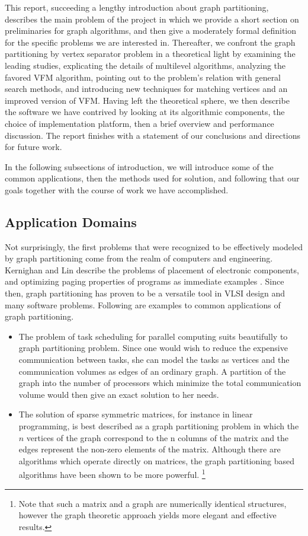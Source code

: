 \documentclass[a4paper,12pt]{article}
\begin{document}
This report, succeeding a lengthy introduction about graph
partitioning, describes the main problem of the project in which we
provide a short section on preliminaries for graph algorithms, and
then give a moderately formal definition for the specific problems we
are interested in. Thereafter, we confront the graph partitioning  by
vertex separator problem in a  theoretical light by examining the
leading studies, explicating the details of multilevel algorithms,
analyzing the favored VFM algorithm, pointing out to the problem's
 relation with
general search methods, and introducing new techniques for matching
vertices and an improved version of VFM. Having left the theoretical
sphere, we then describe the software we have contrived by looking at
its algorithmic components, the choice of implementation platform,
then a brief overview and performance discussion. The report finishes
with a statement of our conclusions and directions for future work.

In the following subsections of introduction, we will
introduce some of the common applications, then the methods used for solution,
and following that our goals together with the course of work we have
accomplished.

\subsection{Application Domains}

Not surprisingly, the first problems that were recognized to be
effectively modeled by graph partitioning come from the realm of
computers and engineering. Kernighan and Lin describe the problems of
placement of electronic components, and optimizing paging properties
of programs as immediate examples \cite{kl}. Since then, graph
partitioning has proven to be a versatile tool in VLSI design and
many software problems. Following are examples to
common applications of graph partitioning.
\begin{itemize}
\item The problem of task scheduling for parallel computing
suits beautifully to graph partitioning problem. Since one would wish to
reduce the expensive communication between tasks, she can model the
tasks as vertices and the communication volumes as edges of an
ordinary graph. A partition of the graph into the number of processors
which minimize the total communication volume would then give
an exact solution to her needs.
\item The solution of sparse symmetric matrices, for instance
in linear programming, is best described as a graph partitioning
problem in which the $n$ vertices of the graph correspond to the n
columns of the matrix and the edges represent the non-zero elements of
the matrix.\cite{bend} Although there are algorithms which operate
directly on matrices, the graph partitioning based algorithms have
been shown to be more powerful.\cite{gupta1} \footnote{Note that such
a matrix and a graph are numerically identical structures, however
the graph theoretic approach yields more elegant and effective
results.}
\end{itemize}
\end{document}
